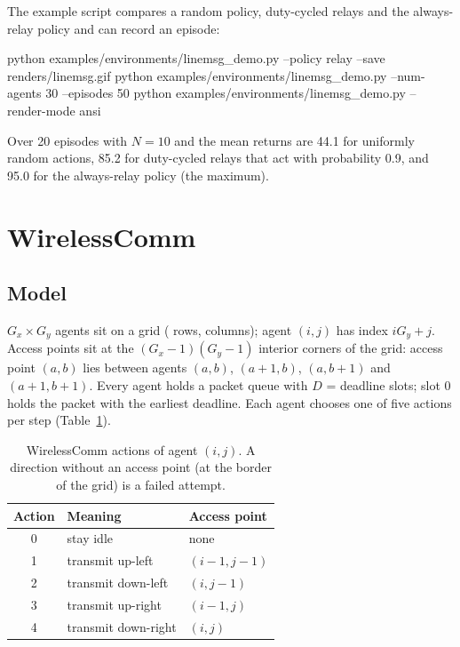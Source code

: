 The example script compares a random policy, duty-cycled relays and the
always-relay policy and can record an episode:

\begin{shellcode}
python examples/environments/linemsg_demo.py --policy relay --save renders/linemsg.gif
python examples/environments/linemsg_demo.py --num-agents 30 --episodes 50
python examples/environments/linemsg_demo.py --render-mode ansi
\end{shellcode}

Over 20 episodes with $N = 10$ and  the mean returns are
44.1 for uniformly random actions, 85.2 for duty-cycled relays that act with
probability 0.9, and 95.0 for the always-relay policy (the maximum).

\section{WirelessComm}\label{sec:wireless}

\subsection{Model}\label{sec:wireless-model}

$G_x \times G_y$ agents sit on a grid ( rows, 
columns); agent $(i, j)$ has index $i G_y + j$. Access points sit at the
$(G_x - 1)(G_y - 1)$ interior corners of the grid: access point $(a, b)$ lies
between agents $(a, b)$, $(a+1, b)$, $(a, b+1)$ and $(a+1, b+1)$. Every agent
holds a packet queue with $D$ =  deadline slots; slot 0 holds the
packet with the earliest deadline. Each agent chooses one of five actions per
step (Table~\ref{tab:wireless-actions}).

\begin{table}[htbp]
  \centering\small
  \caption{WirelessComm actions of agent $(i, j)$. A direction without an
    access point (at the border of the grid) is a failed attempt.}
  \label{tab:wireless-actions}
  \begin{tabular}{@{}cll@{}}
    \toprule
    Action & Meaning & Access point \\
    \midrule
    0 & stay idle & none \\
    1 & transmit up-left & $(i-1, j-1)$ \\
    2 & transmit down-left & $(i, j-1)$ \\
    3 & transmit up-right & $(i-1, j)$ \\
    4 & transmit down-right & $(i, j)$ \\
    \bottomrule
  \end{tabular}
\end{table}

